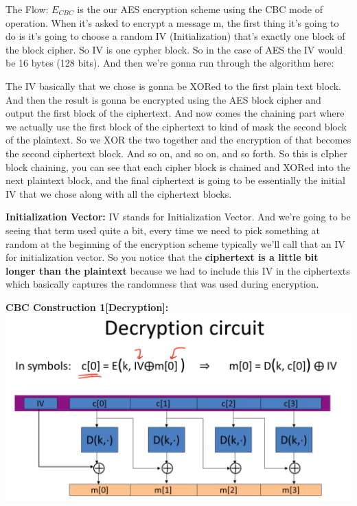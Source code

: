 \documentclass[11pt]{article}
\makeatletter
\def\maxwidth{\ifdim\Gin@nat@width>\linewidth\linewidth
    \else\Gin@nat@width\fi}
\let\Oldincludegraphics\includegraphics
\renewcommand{\includegraphics}[1]{\Oldincludegraphics[width=.8\maxwidth]{#1}}
\makeatother
\begin{document}
The Flow: \(E_{CBC}\) is the our AES encryption scheme using the CBC
mode of operation. When it's asked to encrypt a message m, the first
thing it's going to do is it's going to choose a random IV
(Initialization) that's exactly one block of the block cipher. So IV is
one cypher block. So in the case of AES the IV would be 16 bytes (128
bits). And then we're gonna run through the algorithm here:

The IV basically that we chose is gonna be XORed to the first plain text
block. And then the result is gonna be encrypted using the AES block
cipher and output the first block of the ciphertext. And now comes the
chaining part where we actually use the first block of the ciphertext to
kind of mask the second block of the plaintext. So we XOR the two
together and the encryption of that becomes the second ciphertext block.
And so on, and so on, and so forth. So this is cIpher block chaining,
you can see that each cipher block is chained and XORed into the next
plaintext block, and the final ciphertext is going to be essentially the
initial IV that we chose along with all the ciphertext blocks.

\textbf{Initialization Vector:} IV stands for Initialization Vector. And
we're going to be seeing that term used quite a bit, every time we need
to pick something at random at the beginning of the encryption scheme
typically we'll call that an IV for initialization vector. So you notice
that the \textbf{ciphertext is a little bit longer than the plaintext}
because we had to include this IV in the ciphertexts which basically
captures the randomness that was used during encryption.

\textbf{CBC Construction 1{[}Decryption{]}:}
\includegraphics{./Images/CBC-1Decrypt.png}
\end{document}
